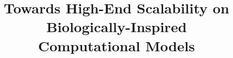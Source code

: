 \documentclass[10pt,journal,compsoc]{IEEEtran}
\begin{document}
%
\title{Towards High-End Scalability on Biologically-Inspired Computational Models}
%
%
%
%
\end{document}

